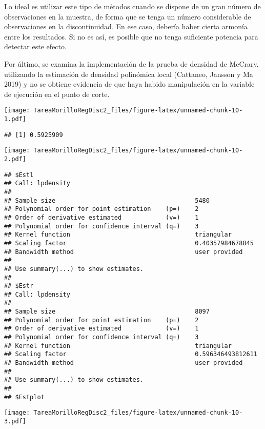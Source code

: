 \documentclass[
]{article}
\begin{document}
Lo ideal es utilizar este tipo de métodos cuando se dispone de un gran
número de observaciones en la muestra, de forma que se tenga un número
considerable de observaciones en la discontinuidad. En ese caso, debería
haber cierta armonía entre los resultados. Si no es así, es posible que
no tenga suficiente potencia para detectar este efecto.

Por último, se examina la implementación de la prueba de densidad de
McCrary, utilizando la estimación de densidad polinómica local
(Cattaneo, Jansson y Ma 2019) y no se obtiene evidencia de que haya
habido manipulación en la variable de ejecución en el punto de corte.

\texttt{[image: TareaMorilloRegDisc2\_files/figure-latex/unnamed-chunk-10-1.pdf]}

\begin{verbatim}
## [1] 0.5925909
\end{verbatim}

\texttt{[image: TareaMorilloRegDisc2\_files/figure-latex/unnamed-chunk-10-2.pdf]}

\begin{verbatim}
## $Estl
## Call: lpdensity
## 
## Sample size                                      5480
## Polynomial order for point estimation    (p=)    2
## Order of derivative estimated            (v=)    1
## Polynomial order for confidence interval (q=)    3
## Kernel function                                  triangular
## Scaling factor                                   0.40357984678845
## Bandwidth method                                 user provided
## 
## Use summary(...) to show estimates.
## 
## $Estr
## Call: lpdensity
## 
## Sample size                                      8097
## Polynomial order for point estimation    (p=)    2
## Order of derivative estimated            (v=)    1
## Polynomial order for confidence interval (q=)    3
## Kernel function                                  triangular
## Scaling factor                                   0.596346493812611
## Bandwidth method                                 user provided
## 
## Use summary(...) to show estimates.
## 
## $Estplot
\end{verbatim}

\texttt{[image: TareaMorilloRegDisc2\_files/figure-latex/unnamed-chunk-10-3.pdf]}
\end{document}
